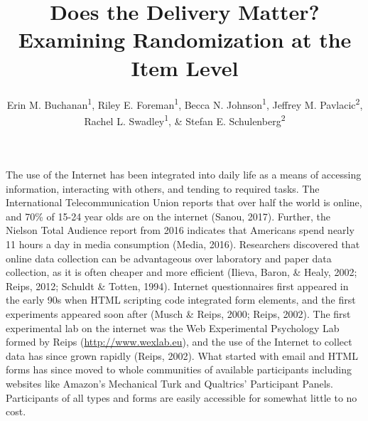 \documentclass[english,man, mask]{apa6}
\title{Does the Delivery Matter? Examining Randomization at the Item Level}
\author{Erin M. Buchanan\textsuperscript{1}, Riley E. Foreman\textsuperscript{1}, Becca N. Johnson\textsuperscript{1}, Jeffrey M. Pavlacic\textsuperscript{2}, Rachel L. Swadley\textsuperscript{1}, \& Stefan E. Schulenberg\textsuperscript{2}}
\affiliation{
    \vspace{0.5cm}
          \textsuperscript{1} Missouri State University\\
          \textsuperscript{2} University of Mississippi  }
\theoremstyle{definition}
\theoremstyle{definition}
\theoremstyle{definition}
\theoremstyle{remark}
\begin{document}
\maketitle

\setcounter{secnumdepth}{0}



The use of the Internet has been integrated into daily life as a means
of accessing information, interacting with others, and tending to
required tasks. The International Telecommunication Union reports that
over half the world is online, and 70\% of 15-24 year olds are on the
internet (Sanou, 2017). Further, the Nielson Total Audience report from
2016 indicates that Americans spend nearly 11 hours a day in media
consumption (Media, 2016). Researchers discovered that online data
collection can be advantageous over laboratory and paper data
collection, as it is often cheaper and more efficient (Ilieva, Baron, \&
Healy, 2002; Reips, 2012; Schuldt \& Totten, 1994). Internet
questionnaires first appeared in the early 90s when HTML scripting code
integrated form elements, and the first experiments appeared soon after
(Musch \& Reips, 2000; Reips, 2002). The first experimental lab on the
internet was the Web Experimental Psychology Lab formed by Reips
(\url{http://www.wexlab.eu}), and the use of the Internet to collect
data has since grown rapidly (Reips, 2002). What started with email and
HTML forms has since moved to whole communities of available
participants including websites like Amazon's Mechanical Turk and
Qualtrics' Participant Panels. Participants of all types and forms are
easily accessible for somewhat little to no cost.
\end{document}
